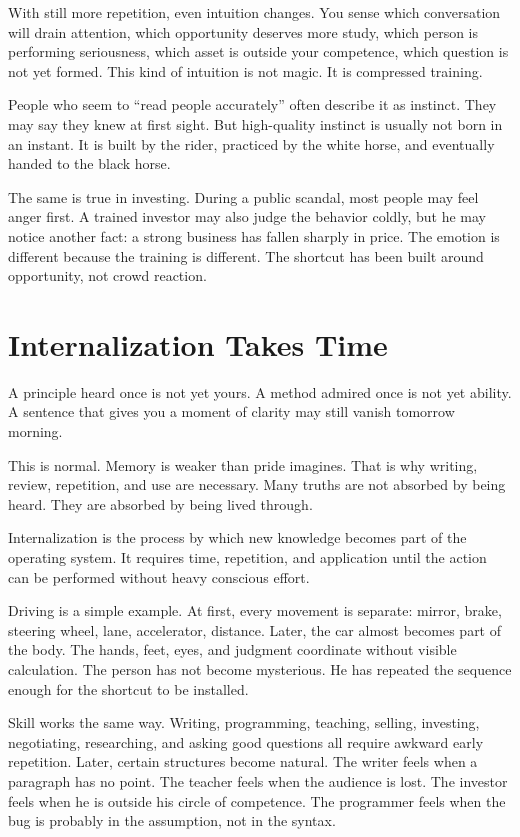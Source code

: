 With still more repetition, even intuition changes. You sense which conversation will drain attention, which opportunity deserves more study, which person is performing seriousness, which asset is outside your competence, which question is not yet formed. This kind of intuition is not magic. It is compressed training.

People who seem to ``read people accurately'' often describe it as instinct. They may say they knew at first sight. But high-quality instinct is usually not born in an instant. It is built by the rider, practiced by the white horse, and eventually handed to the black horse.

The same is true in investing. During a public scandal, most people may feel anger first. A trained investor may also judge the behavior coldly, but he may notice another fact: a strong business has fallen sharply in price. The emotion is different because the training is different. The shortcut has been built around opportunity, not crowd reaction.

\section*{Internalization Takes Time}

A principle heard once is not yet yours. A method admired once is not yet ability. A sentence that gives you a moment of clarity may still vanish tomorrow morning.

This is normal. Memory is weaker than pride imagines. That is why writing, review, repetition, and use are necessary. Many truths are not absorbed by being heard. They are absorbed by being lived through.

Internalization is the process by which new knowledge becomes part of the operating system. It requires time, repetition, and application until the action can be performed without heavy conscious effort.

Driving is a simple example. At first, every movement is separate: mirror, brake, steering wheel, lane, accelerator, distance. Later, the car almost becomes part of the body. The hands, feet, eyes, and judgment coordinate without visible calculation. The person has not become mysterious. He has repeated the sequence enough for the shortcut to be installed.

Skill works the same way. Writing, programming, teaching, selling, investing, negotiating, researching, and asking good questions all require awkward early repetition. Later, certain structures become natural. The writer feels when a paragraph has no point. The teacher feels when the audience is lost. The investor feels when he is outside his circle of competence. The programmer feels when the bug is probably in the assumption, not in the syntax.

